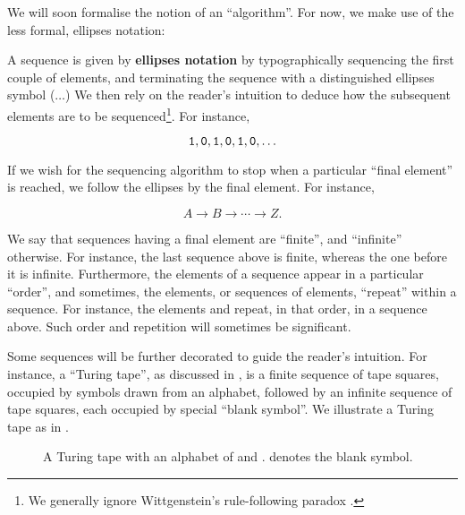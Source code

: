 We will soon formalise the notion of an ``algorithm''. For now, we make use of
the less formal, ellipses notation:

\begin{notation} A sequence is given by \textbf{ellipses notation} by
typographically sequencing the first couple of elements, and terminating the
sequence with a distinguished ellipses symbol ($\ldots$) We then rely on the
reader's intuition to deduce how the subsequent elements are to be
sequenced\footnote{We generally ignore Wittgenstein's rule-following paradox
\cite[\textsection~201, p.  69]{wittgenstein-1953}.}. For instance,

$$\mathtt{1},\mathtt{0},\mathtt{1},\mathtt{0},\mathtt{1},\mathtt{0},\ldots$$

If we wish for the sequencing algorithm to stop when a particular ``final
element'' is reached, we follow the ellipses by the final element. For instance,

$$A\rightarrow B \rightarrow \cdots \rightarrow Z.$$

\end{notation}

We say that sequences having a final element are ``finite'', and ``infinite''
otherwise. For instance, the last sequence above is finite, whereas the one
before it is infinite.  Furthermore, the elements of a sequence appear in a
particular ``order'', and sometimes, the elements, or sequences of elements,
``repeat'' within a sequence. For instance, the elements  and 
repeat, in that order, in a sequence above. Such order and repetition will
sometimes be significant.

Some sequences will be further decorated to guide the reader's intuition. For
instance, a ``Turing tape'', as discussed in ,
is a finite sequence of tape squares, occupied by symbols drawn from an
alphabet, followed by an infinite sequence of tape squares, each occupied by
special ``blank symbol''. We illustrate a Turing tape as in
.
 
\begin{figure}[h!]
\centering
{}
\caption[]{A Turing tape with an alphabet of  and .
\blank{} denotes the blank symbol.}
\label{fig:informal-turing-tape}
\end{figure}

